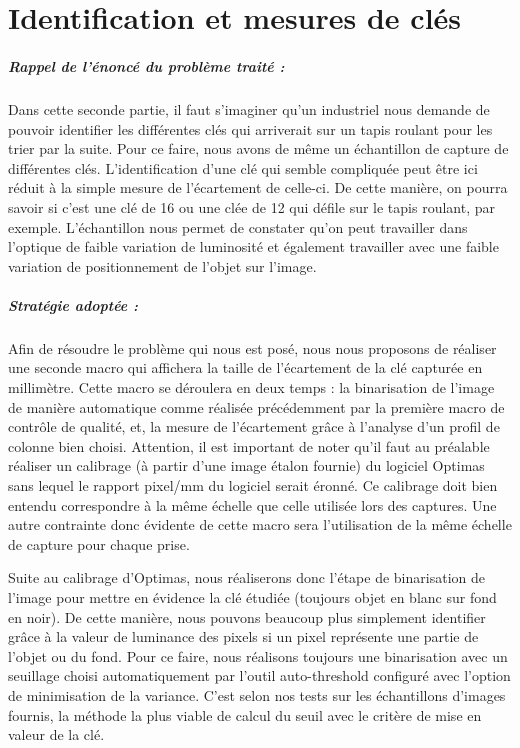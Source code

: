 \documentclass{scrreprt}
\begin{document}
\chapter{Identification et mesures de clés}

\paragraph{Rappel de l'énoncé du problème traité :}
Dans cette seconde partie, il faut s'imaginer qu'un industriel nous demande de pouvoir identifier les différentes clés qui
arriverait sur un tapis roulant pour les trier par la suite. Pour ce faire, nous avons de même un échantillon de capture
de différentes clés. L'identification d'une clé qui semble compliquée peut être ici réduit à la simple
mesure de l'écartement de celle-ci. De cette manière, on pourra savoir si c'est une clé de 16 ou une clée de 12 qui défile 
sur le tapis roulant, par exemple. L'échantillon nous permet de constater qu'on peut travailler dans l'optique de faible
variation de luminosité et également travailler avec une faible variation de positionnement de l'objet sur l'image.
 
\paragraph{Stratégie adoptée :}
Afin de résoudre le problème qui nous est posé, nous nous proposons de réaliser une seconde macro qui affichera
la taille de l'écartement de la clé capturée en millimètre. Cette macro se déroulera en deux temps : la binarisation 
de l'image de manière automatique comme réalisée précédemment par la première macro de contrôle de qualité, et, la mesure
de l'écartement grâce à l'analyse d'un profil de colonne bien choisi. Attention, il est important de noter qu'il faut au 
préalable réaliser un calibrage (à partir d'une image étalon fournie)  du logiciel Optimas sans lequel le rapport pixel/mm
du logiciel serait éronné. Ce calibrage doit bien entendu correspondre à la même échelle que celle utilisée lors des captures.
Une autre contrainte donc évidente de cette macro sera l'utilisation de la même échelle de capture pour chaque prise. 

Suite au calibrage d'Optimas, nous réaliserons donc l'étape de binarisation de l'image pour mettre en évidence la clé étudiée (toujours
objet en blanc sur fond en noir). De cette manière, nous pouvons beaucoup plus simplement identifier grâce à la valeur de luminance 
des pixels si un pixel représente une partie de l'objet ou du fond. Pour ce faire, nous réalisons toujours une binarisation avec un 
seuillage choisi automatiquement par l'outil auto-threshold configuré avec l'option de minimisation de la variance. C'est selon nos 
tests sur les échantillons d'images fournis, la méthode la plus viable de calcul du seuil avec le critère de mise en valeur de la clé. 
\end{document}
